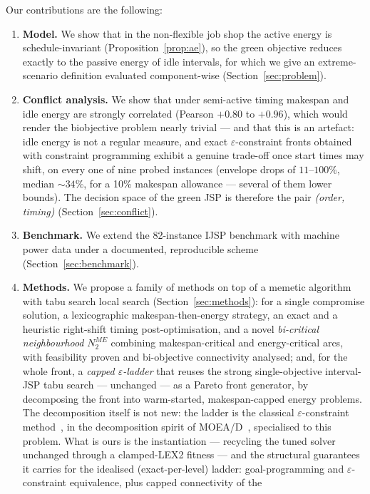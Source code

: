 \documentclass[preprint,12pt]{elsarticle}
\begin{document}
Our contributions are the following:
\begin{enumerate}
\item \textbf{Model.} We show that in the non-flexible job shop the active
energy is schedule-invariant (Proposition~\ref{prop:ae}), so the green
objective reduces exactly to the passive energy of idle intervals, for which
we give an extreme-scenario definition evaluated component-wise
(Section~\ref{sec:problem}).
\item \textbf{Conflict analysis.} We show that under semi-active timing
makespan and idle energy are strongly correlated (Pearson $+0.80$ to
$+0.96$), which would render the biobjective problem nearly trivial --- and
that this is an artefact: idle energy is not a regular measure, and exact
$\varepsilon$-constraint fronts obtained with constraint programming exhibit
a genuine trade-off once start times may shift, on every one of nine probed
instances (envelope drops of $11$--$100\%$, median ${\sim}34\%$, for a 10\%
makespan allowance --- several of them lower bounds). The decision space of
the green JSP is therefore the pair \emph{(order, timing)}
(Section~\ref{sec:conflict}).
\item \textbf{Benchmark.} We extend the 82-instance IJSP benchmark with
machine power data under a documented, reproducible scheme
(Section~\ref{sec:benchmark}).
\item \textbf{Methods.} We propose a family of methods on top of a
memetic algorithm with tabu search local search
(Section~\ref{sec:methods}): for a single compromise solution, a
lexicographic makespan-then-energy strategy, an exact and a heuristic
right-shift timing post-optimisation, and a novel \emph{bi-critical
neighbourhood} $N_2^{ME}$ combining makespan-critical and energy-critical
arcs, with feasibility proven and bi-objective connectivity analysed; and,
for the whole front, a \emph{capped $\varepsilon$-ladder} that reuses the
strong single-objective interval-JSP tabu search --- unchanged --- as a
Pareto front generator, by decomposing the front into warm-started,
makespan-capped energy problems. The decomposition itself is not new: the
ladder is the classical $\varepsilon$-constraint method~\cite{Haimes1971},
in the decomposition spirit of MOEA/D~\cite{ZhangLi2007}, specialised to this
problem. What is ours is the instantiation --- recycling the tuned solver
unchanged through a clamped-LEX2 fitness --- and the structural guarantees
it carries for the idealised (exact-per-level) ladder: goal-programming and
$\varepsilon$-constraint equivalence, plus capped connectivity of the

\end{enumerate}
\end{document}
